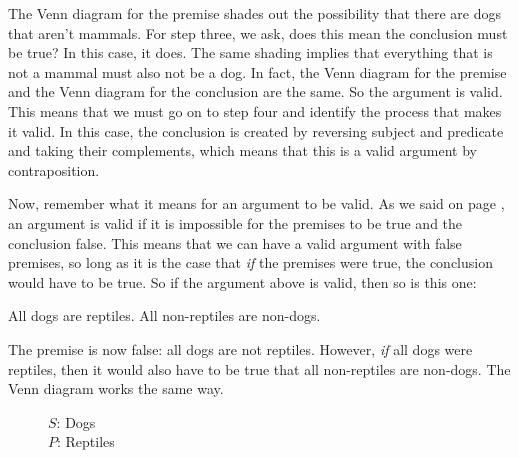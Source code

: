 The Venn diagram for the premise shades out the possibility that there are dogs that aren't mammals. For step three, we ask, does this mean the conclusion must be true?  In this case, it does. The same shading implies that everything that is not a mammal must also not be a dog. In fact, the Venn diagram for the premise and the Venn diagram for the conclusion are the same. So the argument is valid. This means that we must go on to step four and identify the process that makes it valid. In this case, the conclusion is created by reversing subject and predicate and taking their complements, which means that this is a valid argument by contraposition.
   
Now, remember what it means for an argument to be valid. \label{valid_definition_reinforcement} As we said on page \pageref{def:valid}, an argument is valid if it is impossible for the premises to be true and the conclusion false. This means that we can have a valid argument with false premises, so long as it is the case that \emph{if} the premises were true, the conclusion would have to be true. So if the argument above is valid, then so is this one:

\begin{earg*}
\item All dogs are reptiles.
\itemc[.3] All non-reptiles are non-dogs.
\end{earg*}

The premise is now false: all dogs are not reptiles. However, \emph{if} all dogs were reptiles, then it would also have to be true that all non-reptiles are non-dogs. The Venn diagram works the same way.

\begin{figure}[H]
\begin{center}
\end{center}
\captionsetup{singlelinecheck=on}
\caption*{$S$: Dogs \\ $P$: Reptiles}
\end{figure}

